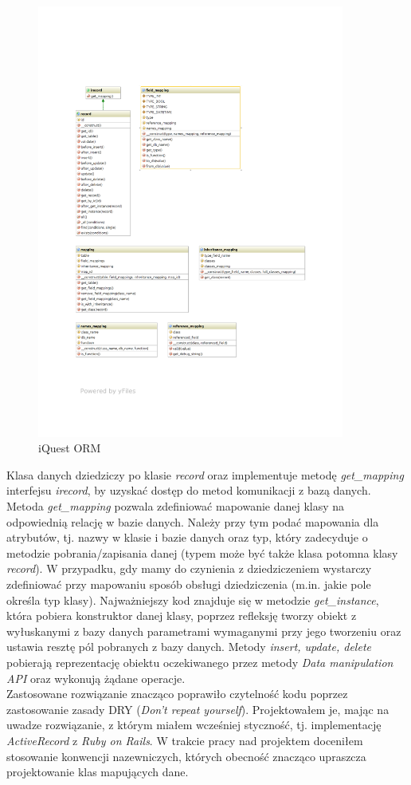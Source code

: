 \begin{figure}[H]
\begin{center}
\includegraphics[width=0.9\textwidth]{figures/lw/orm.pdf} 
\end{center}
\caption{iQuest ORM}
\label{fig:orm}
\end{figure}
Klasa danych dziedziczy po klasie \emph{record} oraz implementuje metodę \emph{get\_mapping} interfejsu \emph{irecord}, by uzyskać dostęp do metod komunikacji z bazą danych. Metoda \emph{get\_mapping} pozwala zdefiniować mapowanie danej klasy na odpowiednią relację w bazie danych. Należy przy tym podać mapowania dla atrybutów, tj. nazwy w klasie i bazie danych oraz typ, który zadecyduje o metodzie pobrania/zapisania danej (typem może być także klasa potomna klasy \emph{record}). W przypadku, gdy mamy do czynienia z dziedziczeniem wystarczy zdefiniować przy mapowaniu sposób obsługi dziedziczenia (m.in. jakie pole określa typ klasy). Najważniejszy kod znajduje się w metodzie \emph{get\_instance}, która pobiera konstruktor danej klasy, poprzez refleksję tworzy obiekt z wyłuskanymi z bazy danych parametrami wymaganymi przy jego tworzeniu oraz ustawia resztę pól pobranych z bazy danych. Metody \emph{insert, update, delete} pobierają reprezentację obiektu oczekiwanego przez metody \emph{Data manipulation API} oraz wykonują żądane operacje.\\
Zastosowane rozwiązanie znacząco poprawiło czytelność kodu poprzez zastosowanie zasady DRY (\emph{Don't repeat yourself}). Projektowałem je, mając na uwadze rozwiązanie, z którym miałem wcześniej styczność, tj. implementację \emph{ActiveRecord} z \emph{Ruby on Rails}. W trakcie pracy nad projektem doceniłem stosowanie konwencji nazewniczych, których obecność znacząco upraszcza projektowanie klas mapujących dane.

